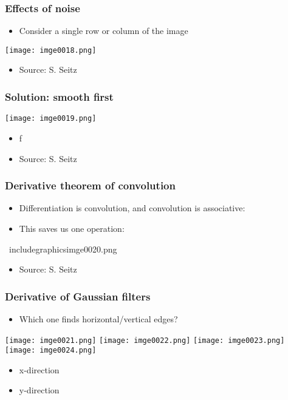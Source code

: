 \begin{frame}
\frametitle{Effects of noise}
\begin{itemize}
\item Consider a single row or column of the image
\end{itemize}
\texttt{[image: imge0018.png]}
\begin{itemize}
\item Source: S. Seitz
\end{itemize}

\end{frame}


\begin{frame}
\frametitle{Solution: smooth first}
\texttt{[image: imge0019.png]}
\begin{itemize}
\item f
\end{itemize}
\begin{itemize}
\item Source: S. Seitz
\end{itemize}

\end{frame}


\begin{frame}
\frametitle{Derivative theorem of convolution}
\begin{itemize}
\item Differentiation is convolution, and convolution is associative:
\item This saves us one operation:
\end{itemize}
\ includegraphics{imge0020.png}
\begin{itemize}
\item Source: S. Seitz
\end{itemize}

\end{frame}


\begin{frame}
\frametitle{Derivative of Gaussian filters}
\begin{itemize}
\item Which one finds horizontal/vertical edges?
\end{itemize}
\texttt{[image: imge0021.png]}
\texttt{[image: imge0022.png]}
\texttt{[image: imge0023.png]}
\texttt{[image: imge0024.png]}
\begin{itemize}
\item x-direction
\end{itemize}
\begin{itemize}
\item y-direction
\end{itemize}

\end{frame}


